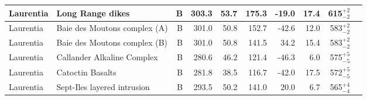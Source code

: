 \begin{longtable}{p{1 in}p{1 in}rrrrrrrp{1.5 in}}
                     Laurentia &                                 Long Range dikes &      B &     303.3 &      53.7 & 175.3 & -19.0 &      17.4 &      615$^{+2}_{-2}$ &                                 \cite{Murthy1992a} \\ \hline
                     Laurentia &                         Baie des Moutons complex (A) &      B &     301.0 &      50.8 & 152.7 & -42.6 &      12.0 &      583$^{+2}_{-2}$ &                             \cite{McCausland2011a} \\ \hline
                     Laurentia &                         Baie des Moutons complex (B) &      B &     301.0 &      50.8 & 141.5 &  34.2 &      15.4 &      583$^{+2}_{-2}$ &                             \cite{McCausland2011a} \\ \hline
                     Laurentia &                       Callander Alkaline Complex &      B &     280.6 &      46.2 & 121.4 & -46.3 &       6.0 &      575$^{+5}_{-5}$ &                                 \cite{Symons1991a} \\ \hline
                     Laurentia &                                 Catoctin Basalts &      B &     281.8 &      38.5 & 116.7 & -42.0 &      17.5 &      572$^{+5}_{-5}$ &                                  \cite{Meert1994a} \\ \hline
                     Laurentia &                      Sept-Iles layered intrusion &      B &     293.5 &      50.2 & 141.0 &  20.0 &       6.7 &      565$^{+4}_{-4}$ &                                 \cite{Tanczyk1987a} \\ \hline
\end{longtable}
